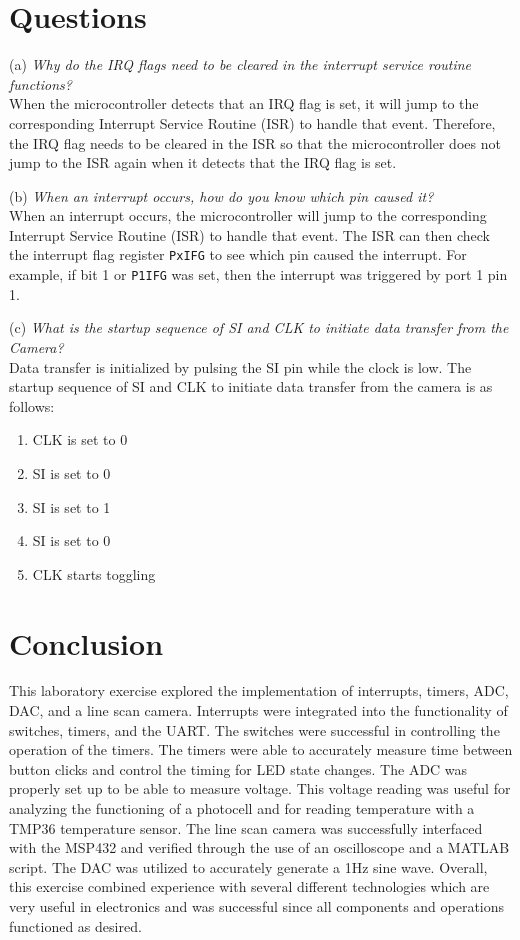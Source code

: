 \documentclass[CMPE]{KGCOEReport}
\begin{document}
\section*{Questions}

(a) \emph{Why do the IRQ flags need to be cleared in the interrupt service routine functions?}\\

When the microcontroller detects that an IRQ flag is set, it will jump to the corresponding Interrupt Service Routine (ISR) to handle that event. Therefore, the IRQ flag needs to be cleared in the ISR so that the microcontroller does not jump to the ISR again when it detects that the IRQ flag is set.
\bigskip

(b) \emph{When an interrupt occurs, how do you know which pin caused it?}\\

When an interrupt occurs, the microcontroller will jump to the corresponding Interrupt Service Routine (ISR) to handle that event. The ISR can then check the interrupt flag register \verb|PxIFG| to see which pin caused the interrupt. For example, if bit 1 or \verb|P1IFG| was set, then the interrupt was triggered by port 1 pin 1.
\bigskip

(c) \emph{What is the startup sequence of SI and CLK to initiate data transfer from the Camera?}\\

Data transfer is initialized by pulsing the SI pin while the clock is low. The startup sequence of SI and CLK to initiate data transfer from the camera is as follows:

\begin{enumerate}
    \item CLK is set to 0
    \item SI is set to 0
    \item SI is set to 1
    \item SI is set to 0
    \item CLK starts toggling
\end{enumerate}

\section*{Conclusion}

This laboratory exercise explored the implementation of interrupts, timers, ADC, DAC, and a line scan camera. Interrupts were integrated into the functionality of switches, timers, and the UART. The switches were successful in controlling the operation of the timers. The timers were able to accurately measure time between button clicks and control the timing for LED state changes. The ADC was properly set up to be able to measure voltage. This voltage reading was useful for analyzing the functioning of a photocell and for reading temperature with a TMP36 temperature sensor. The line scan camera was successfully interfaced with the MSP432 and verified through the use of an oscilloscope and a MATLAB script. The DAC was utilized to accurately generate a 1Hz sine wave. Overall, this exercise combined experience with several different technologies which are very useful in electronics and was successful since all components and operations functioned as desired. 
\end{document}
